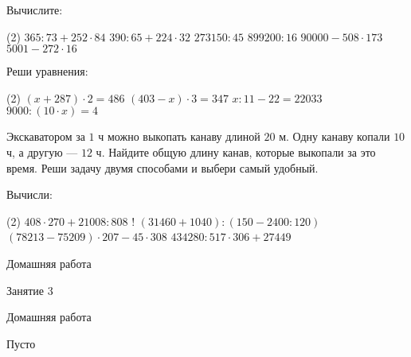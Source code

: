 \begin{class}[number=2]
\begin{listofex}
		\item Вычислите:
			\begin{tasks}(2)
			\task  \( 365:73+252\cdot84 \)
			\task \( 390:65+224\cdot32 \)
			\task \( 273150:45 \)
			\task \( 899200:16 \)
			\task \( 90000-508\cdot173 \)
			\task \( 5001-272\cdot16 \)
			\end{tasks}
		\item Реши уравнения:
		\begin{tasks}(2)
			\task \( (x+287)\cdot2=486 \)
			\task \( (403-x)\cdot3=347 \)
			\task \( x:11-22=22033 \)
			\task \( 9000:(10\cdot x)=4 \)
		\end{tasks}
		\item Экскаватором за \( 1 \) ч можно выкопать канаву длиной \( 20 \) м. Одну канаву копали \( 10 \) ч, а другую --- \( 12 \) ч. Найдите общую длину канав, которые выкопали за это время. Реши задачу двумя способами и выбери самый удобный.
		\item Вычисли:
		\begin{tasks}(2)
			\task \( 408\cdot270+21008:808 \)
			\task! \( (31460+1040):(150-2400:120) \)
			\task \( (78213-75209)\cdot207-45\cdot308 \)
			\task \( 434280:517\cdot306+27449 \)
		\end{tasks}
	\end{listofex}
\end{class}

\begin{homework}[number=2]
	\begin{listofex}
		\item Домашняя работа
	\end{listofex}
\end{homework}

\begin{class}[number=3]
	\begin{listofex}
		\item Занятие 3
	\end{listofex}
\end{class}

\begin{homework}[number=3]
	\begin{listofex}
		\item Домашняя работа
	\end{listofex}
\end{homework}

\begin{class}[number=4]
	\begin{listofex}
		\item Пусто
	\end{listofex}
\end{class}
